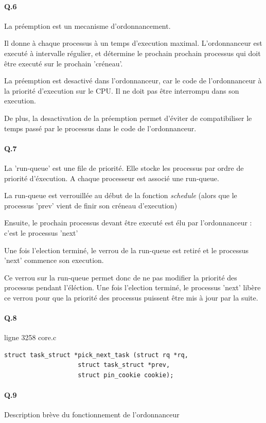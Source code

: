 \documentclass[10pt]{article}
\begin{document}
\paragraph{Q.6}
La préemption est un mecanisme d'ordonnancement.

Il donne à chaque processus à un temps d'execution maximal. \label{preempt}
L'ordonnanceur est executé à intervalle régulier, et détermine le prochain prochain
processus qui doit être executé sur le prochain 'créneau'.

La préemption est desactivé dans l'ordonnanceur, car le code de l'ordonnanceur à la priorité d'execution sur le CPU.
Il ne doit pas être interrompu dans son execution.

De plus, la desactivation de la préemption permet d'éviter de compatibiliser
le temps passé par le processus dans le code de l'ordonnanceur.

 \paragraph{Q.7}
 La 'run-queue' est une file de priorité. Elle stocke les processus par ordre de priorité d'éxecution.
 A chaque processeur est associé une run-queue.
 
 La run-queue est verrouillée au début de la fonction \textit{schedule} (alors que le processus 'prev' vient de finir son créneau d'execution)
 
 Ensuite, le prochain processus devant être executé est élu par l'ordonnanceur : c'est le processus 'next'
 
 Une fois l'election terminé, le verrou de la run-queue est retiré et le processus 'next' commence son execution.
 
 Ce verrou sur la run-queue permet donc de ne pas modifier la priorité des processus pendant l'éléction.
 Une fois l'election terminé, le processus 'next' libère ce verrou pour que la priorité des processus puissent être mis à jour par la suite.
 
\paragraph{Q.8} ligne 3258 core.c
\lstset{language=C}
\begin{lstlisting}[frame=single]
struct task_struct *pick_next_task (struct rq *rq,
				    struct task_struct *prev,
				    struct pin_cookie cookie);
\end{lstlisting}

  \newpage
 \paragraph{Q.9}
    Description brève du fonctionnement de l'ordonnanceur
    
\end{document}
